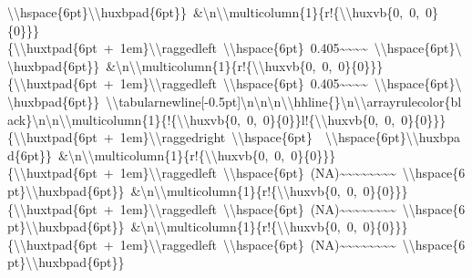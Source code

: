 \documentclass[
  english,
  man]{apa6}
\begin{document}
\textbackslash{}\textbackslash{}hspace\{6pt\}\textbackslash{}\textbackslash{}huxbpad\{6pt\}\}\ \&\textbackslash{}n\textbackslash{}\textbackslash{}multicolumn\{1\}\{r!\{\textbackslash{}\textbackslash{}huxvb\{0,\ 0,\ 0\}\{0\}\}\}\{\textbackslash{}\textbackslash{}huxtpad\{6pt\ +\ 1em\}\textbackslash{}\textbackslash{}raggedleft\ \textbackslash{}\textbackslash{}hspace\{6pt\}\ 0.405\textasciitilde{}\textasciitilde{}\textasciitilde{}\textasciitilde{}\ \textbackslash{}\textbackslash{}hspace\{6pt\}\textbackslash{}\textbackslash{}huxbpad\{6pt\}\}\ \&\textbackslash{}n\textbackslash{}\textbackslash{}multicolumn\{1\}\{r!\{\textbackslash{}\textbackslash{}huxvb\{0,\ 0,\ 0\}\{0\}\}\}\{\textbackslash{}\textbackslash{}huxtpad\{6pt\ +\ 1em\}\textbackslash{}\textbackslash{}raggedleft\ \textbackslash{}\textbackslash{}hspace\{6pt\}\ 0.405\textasciitilde{}\textasciitilde{}\textasciitilde{}\textasciitilde{}\ \textbackslash{}\textbackslash{}hspace\{6pt\}\textbackslash{}\textbackslash{}huxbpad\{6pt\}\}\ \textbackslash{}\textbackslash{}tabularnewline{[}-0.5pt{]}\textbackslash{}n\textbackslash{}n\textbackslash{}n\textbackslash{}\textbackslash{}hhline\{\}\textbackslash{}n\textbackslash{}\textbackslash{}arrayrulecolor\{black\}\textbackslash{}n\textbackslash{}n\textbackslash{}\textbackslash{}multicolumn\{1\}\{!\{\textbackslash{}\textbackslash{}huxvb\{0,\ 0,\ 0\}\{0\}\}l!\{\textbackslash{}\textbackslash{}huxvb\{0,\ 0,\ 0\}\{0\}\}\}\{\textbackslash{}\textbackslash{}huxtpad\{6pt\ +\ 1em\}\textbackslash{}\textbackslash{}raggedright\ \textbackslash{}\textbackslash{}hspace\{6pt\}\ \ \textbackslash{}\textbackslash{}hspace\{6pt\}\textbackslash{}\textbackslash{}huxbpad\{6pt\}\}\ \&\textbackslash{}n\textbackslash{}\textbackslash{}multicolumn\{1\}\{r!\{\textbackslash{}\textbackslash{}huxvb\{0,\ 0,\ 0\}\{0\}\}\}\{\textbackslash{}\textbackslash{}huxtpad\{6pt\ +\ 1em\}\textbackslash{}\textbackslash{}raggedleft\ \textbackslash{}\textbackslash{}hspace\{6pt\}\ (NA)\textasciitilde{}\textasciitilde{}\textasciitilde{}\textasciitilde{}\textasciitilde{}\textasciitilde{}\textasciitilde{}\textasciitilde{}\ \textbackslash{}\textbackslash{}hspace\{6pt\}\textbackslash{}\textbackslash{}huxbpad\{6pt\}\}\ \&\textbackslash{}n\textbackslash{}\textbackslash{}multicolumn\{1\}\{r!\{\textbackslash{}\textbackslash{}huxvb\{0,\ 0,\ 0\}\{0\}\}\}\{\textbackslash{}\textbackslash{}huxtpad\{6pt\ +\ 1em\}\textbackslash{}\textbackslash{}raggedleft\ \textbackslash{}\textbackslash{}hspace\{6pt\}\ (NA)\textasciitilde{}\textasciitilde{}\textasciitilde{}\textasciitilde{}\textasciitilde{}\textasciitilde{}\textasciitilde{}\textasciitilde{}\ \textbackslash{}\textbackslash{}hspace\{6pt\}\textbackslash{}\textbackslash{}huxbpad\{6pt\}\}\ \&\textbackslash{}n\textbackslash{}\textbackslash{}multicolumn\{1\}\{r!\{\textbackslash{}\textbackslash{}huxvb\{0,\ 0,\ 0\}\{0\}\}\}\{\textbackslash{}\textbackslash{}huxtpad\{6pt\ +\ 1em\}\textbackslash{}\textbackslash{}raggedleft\ \textbackslash{}\textbackslash{}hspace\{6pt\}\ (NA)\textasciitilde{}\textasciitilde{}\textasciitilde{}\textasciitilde{}\textasciitilde{}\textasciitilde{}\textasciitilde{}\textasciitilde{}\ \textbackslash{}\textbackslash{}hspace\{6pt\}\textbackslash{}\textbackslash{}huxbpad\{6pt\}\}\ 
\end{document}
